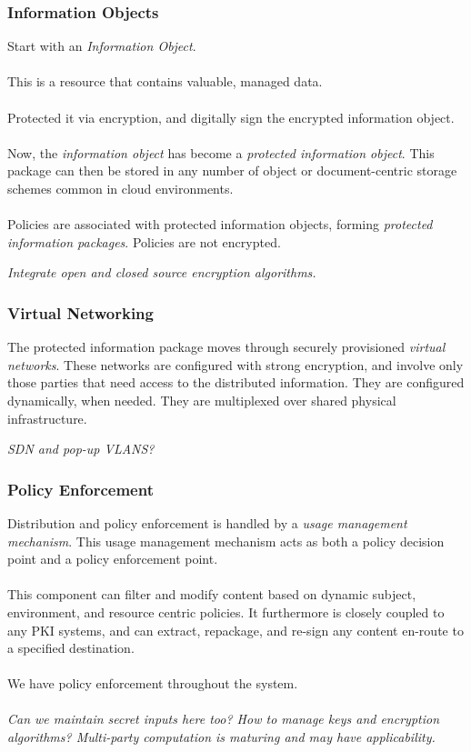 \documentclass[t,handout]{beamer}
\begin{document}
\begin{frame}
\frametitle{Information Objects}
Start with an {\sl Information Object}.\\~\\

This is a resource that contains valuable, managed data.\\~\\

Protected it via encryption, and digitally sign the encrypted information object. \\~\\

Now, the {\sl information object} has become a {\sl protected information object}.  This package can then be stored in any number of object or document-centric storage schemes common in cloud environments.\\~\\

Policies are associated with protected information objects, forming {\sl protected information packages}.  Policies are not encrypted.

{\sl Integrate open and closed source encryption algorithms. }
\end{frame}

\begin{frame}
\frametitle{Virtual Networking}
The protected information package moves through securely provisioned {\sl virtual networks}.  These networks are configured with strong encryption, and involve only those parties that need access to the distributed information.  They are configured dynamically, when needed.  They are multiplexed over shared physical infrastructure.

{\sl SDN and pop-up VLANS?}
\end{frame}

\begin{frame}
\frametitle{Policy Enforcement}
Distribution and policy enforcement is handled by a {\sl usage management mechanism}.  This usage management mechanism acts as both a policy decision point and a policy enforcement point. \\~\\

This component can filter and modify content based on dynamic subject, environment, and resource centric policies. It furthermore is closely coupled to any PKI systems, and can extract, repackage, and re-sign any content en-route to a specified destination.\\~\\

We have policy enforcement throughout the system.\\~\\

{\sl Can we maintain secret inputs here too? How to manage keys and encryption algorithms? Multi-party computation is maturing and may have applicability.}
\end{frame}
\end{document}
